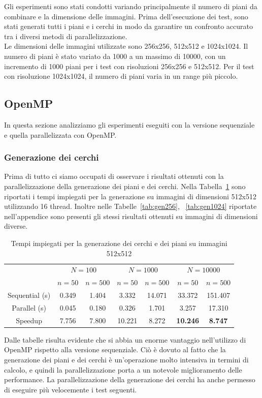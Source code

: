 Gli esperimenti sono stati condotti variando principalmente il numero di piani da combinare e la dimensione delle immagini.
Prima dell'esecuzione dei test, sono stati generati tutti i piani e i cerchi in modo da garantire un confronto accurato
tra i diversi metodi di parallelizzazione.\\
Le dimensioni delle immagini utilizzate sono 256x256, 512x512 e 1024x1024.
Il numero di piani è stato variato da 1000 a un massimo di 10000, con un incremento di 1000 piani per i test con risoluzioni 256x256 e 512x512.
Per il test con risoluzione 1024x1024, il numero di piani varia in un range più piccolo.

\subsection{OpenMP}\label{subsec:test_openmp}
In questa sezione analizziamo gli esperimenti eseguiti con la versione sequenziale e quella parallelizzata con OpenMP.
\subsubsection{Generazione dei cerchi}
Prima di tutto ci siamo occupati di osservare i risultati ottenuti con la parallelizzazione della generazione dei piani e dei cerchi.
Nella Tabella~\ref{tab:gen512} sono riportati i tempi impiegati per la generazione su immagini di dimensioni 512x512 utilizzando 16 thread.
Inoltre nelle Tabelle~\ref{tab:gen256}, ~\ref{tab:gen1024} riportate nell'appendice sono presenti gli stessi risultati ottenuti su immagini di dimensioni diverse.
\begin{table}[H]
    \centering
    \begin{tabular}{c|c|c|c|c|c|c|}
        & \multicolumn{2}{|c|}{$N = 100$} & \multicolumn{2}{|c|}{$N = 1000$} & \multicolumn{2}{|c|}{$N = 10000$} \\
        & $n=50$ & $n=500$ & $n=50$ & $n=500$ & $n=50$ & $n=500$ \\
        \hline
        Sequential (s) & 0.349 & 1.404 & 3.332 & 14.071 & 33.372 & 151.407 \\
        Parallel (s) & 0.045 & 0.180 & 0.326 & 1.701 & 3.257 & 17.310 \\
        Speedup & 7.756 & 7.800 & 10.221 & 8.272 & \textbf{10.246} & \textbf{8.747} \\
    \end{tabular}
    \caption{\label{tab:gen512}Tempi impiegati per la generazione dei cerchi e dei piani su immagini 512x512}
\end{table}
Dalle tabelle risulta evidente che si abbia un enorme vantaggio nell'utilizzo di OpenMP rispetto alla versione sequenziale.
Ciò è dovuto al fatto che la generazione dei piani e dei cerchi è un'operazione molto intensiva in termini di calcolo,
e quindi la parallelizzazione porta a un notevole miglioramento delle performance.
La parallelizzazione della generazione dei cerchi ha anche permesso di eseguire più velocemente i test seguenti.

